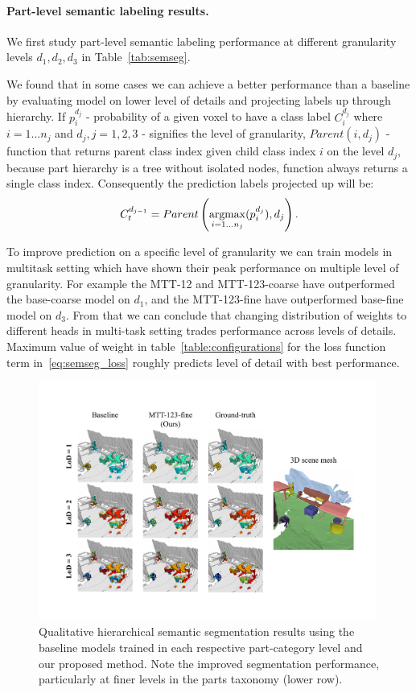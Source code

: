 \paragraph{Part-level semantic labeling results. }
\label{results:semseg}
We first study part-level semantic labeling performance at different granularity levels $d_1, d_2, d_3$ in Table~\ref{tab:semseg}. 

We found that in some cases we can achieve a better performance than a baseline by evaluating model on lower level of details and projecting labels up through hierarchy. If $p_i^{d_j}$ - probability of a given voxel to have a class label $C_i^{d_j}$ where $i=1...n_j$ and $d_j, j=1, 2, 3$ - signifies the level of granularity, $Parent(i, d_j)$ - function that returns parent class index given child class index $i$ on the level $d_j$, because part hierarchy is a tree without isolated nodes, function always returns a single class index. Consequently the prediction labels projected up will be:
\begin{equation}
C_t^{d_{j-1}} = Parent\left(\operatorname*{\mathrm{argmax}}_{i=1...n_j}(p_i^{d_j}), d_j\right) .
\end{equation}

To improve prediction on a specific level of granularity we can train models in multitask setting which have shown their peak performance on multiple level of granularity. For example the MTT-12 and MTT-123-coarse have outperformed the base-coarse model on $d_1$, and the MTT-123-fine have outperformed base-fine model on $d_3$.
From that we can conclude that changing distribution of weights to different heads in multi-task setting trades performance across levels of details. Maximum value of weight in table~\ref{table:configurations} for the loss function term in~\eqref{eq:semseg_loss} roughly predicts level of detail with best performance.

\begin{figure}[!t]
\label{fig:experiments_visual}
\centering
\includegraphics[width=0.99\textwidth]{Figures/scan2part/experiments_visual.pdf}
\caption{Qualitative hierarchical semantic segmentation results using the baseline models trained in each respective part-category level and our proposed method. Note the improved segmentation performance, particularly at finer levels in the parts taxonomy (lower row).}
\label{fig:hierarchical_seg_visual}
\end{figure}

